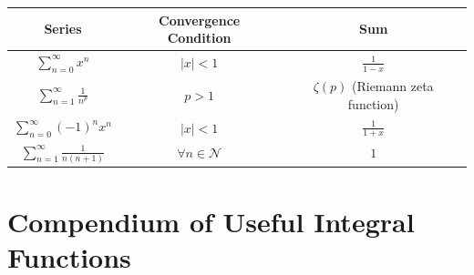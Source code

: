 \documentclass{article}
\begin{document}
\renewcommand{\arraystretch}{1.5}
\begin{center}
    \begin{tabular}{|c|c|c|}
        \hline
        \textbf{Series}                        & \textbf{Convergence Condition} & \textbf{Sum}                       \\
        \hline
        $\sum_{n=0}^{\infty} x^n$              & $|x| < 1$                      & $\frac{1}{1-x}$                    \\
        \hline
        $\sum_{n=1}^{\infty} \frac{1}{n^p}$    & $p > 1$                        & $\zeta(p)$ (Riemann zeta function) \\
        \hline
        $\sum_{n=0}^{\infty} (-1)^n x^n$       & $|x| < 1$                      & $\frac{1}{1+x}$                    \\
        \hline
        $\sum_{n=1}^{\infty} \frac{1}{n(n+1)}$ & $\forall n \in \mathcal{N}$    & $1$                                \\
        \hline
    \end{tabular}
\end{center}


\newpage

\section{Compendium of Useful Integral Functions}
\end{document}
